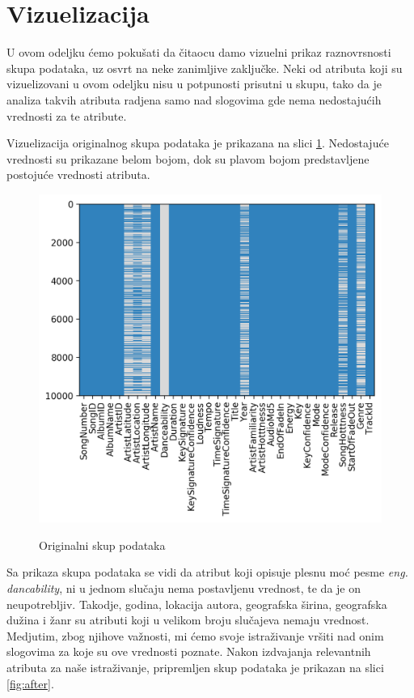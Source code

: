 \section{Vizuelizacija}
\label{sec:Vizuelizacija}

U ovom odeljku \'c{}emo poku\v{s}ati da \v{c}itaocu damo vizuelni prikaz raznovrsnosti skupa podataka, uz osvrt na neke zanimljive zaklju\v{c}ke. Neki od atributa koji su vizuelizovani u ovom odeljku nisu u potpunosti prisutni u skupu, tako da je analiza takvih atributa radjena samo nad slogovima gde nema nedostaju\'c{}ih vrednosti za te atribute.

Vizuelizacija originalnog skupa podataka je prikazana na slici \ref{fig:before}. Nedostaju\'c{}e vrednosti su prikazane belom bojom, dok su plavom bojom predstavljene postoju\'c{}e vrednosti atributa.
\begin{figure}[H]
    \includegraphics[scale=0.8]{resources/before_processing.png}
    \label{fig:before}
    \caption{Originalni skup podataka}
\end{figure}

 Sa prikaza skupa podataka se vidi da atribut koji opisuje plesnu mo\'c{} pesme \emph{eng. dancability}, ni u jednom slu\v{c}aju nema postavljenu vrednost, te da je on neupotrebljiv. Takodje, godina, lokacija autora, geografska \v{s}irina, geografska du\v{z}ina i \v{z}anr su atributi koji u velikom broju slu\v{c}ajeva nemaju vrednost. Medjutim, zbog njihove va\v{z}nosti, mi \'c{}emo svoje istra\v{z}ivanje vr\v{s}iti nad onim slogovima za koje su ove vrednosti poznate. Nakon izdvajanja relevantnih atributa za na\v{s}e istra\v{z}ivanje, pripremljen skup podataka je prikazan na slici \ref{fig:after}.

